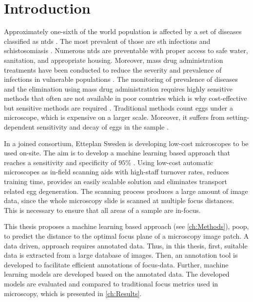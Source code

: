 \chapter{Introduction}
\label{ch:Introduction}

Approximately one-sixth of the world population is affected by a set of diseases classified as \acfp{ntd} \cite{feasey2010neglected}. The most prevalent of those are \acf{sth} infections and schistosomiasis \cite{barenbold2017estimating}. Numerous \acp{ntd} are preventable with proper access to safe water, sanitation, and appropriate housing. Moreover, mass drug administration treatments have been conducted to reduce the severity and prevalence of infections in vulnerable populations \cite{jourdan2018soiltransmitted}. The monitoring of prevalence of diseases and the elimination using mass drug administration requires highly sensitive methods that often are not available in poor countries which is why cost-effective but sensitive methods are required \cite{mbongngwese2020diagnostic}.
Traditional methods count eggs under a microscope, which is expensive on a larger scale. Moreover, it suffers from setting-dependent sensitivity and decay of eggs in the sample \cite{barenbold2017estimating}. 

In a joined consortium,  Etteplan Sweden \cite{etteplanoyjengineering} is developing low-cost microscopes to be used on-site. The aim is to develop a machine learning based approach that reaches a sensitivity and specificity of $95 \%$ 
\cite{etteplan2021fighting}. Using low-cost automatic microscopes as in-field scanning aids with high-staff turnover rates, reduces training time, provides an easily scalable solution and eliminates transport related egg degeneration.
The scanning process produces a large amount of image data, since the whole microscopy slide is scanned at multiple focus distances. This is necessary to ensure that all areas of a sample are in-focus.

This thesis proposes a machine learning based approach (see \autoref{ch:Methods}), \ac{poop}, to predict the distance to the optimal focus plane of a microscopy image patch. A data driven, approach requires annotated data. Thus, in this thesis, first, suitable data is extracted from a large database of images. Then, an annotation tool is developed to facilitate efficient annotations of focus-data. Further, machine learning models are developed based on the annotated data. The developed models are evaluated and compared to traditional focus metrics used in microscopy, which is presented in \autoref{ch:Results}.

